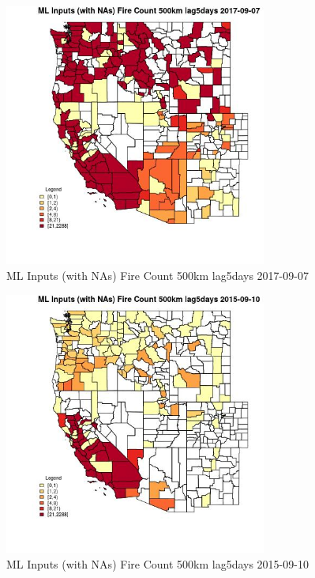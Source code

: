 \begin{figure} 
\centering  
\includegraphics[width=0.77\textwidth]{Code_Outputs/Report_ML_input_PM25_Step4_part_e_de_duplicated_aves_compiled_2019-05-21wNAs_CountyFire_Count_500km_lag5daysMean2017-09-07.jpg} 
\caption{\label{fig:Report_ML_input_PM25_Step4_part_e_de_duplicated_aves_compiled_2019-05-21wNAsCountyFire_Count_500km_lag5daysMean2017-09-07}ML Inputs (with NAs) Fire Count 500km lag5days 2017-09-07} 
\end{figure} 
 

\begin{figure} 
\centering  
\includegraphics[width=0.77\textwidth]{Code_Outputs/Report_ML_input_PM25_Step4_part_e_de_duplicated_aves_compiled_2019-05-21wNAs_CountyFire_Count_500km_lag5daysMean2015-09-10.jpg} 
\caption{\label{fig:Report_ML_input_PM25_Step4_part_e_de_duplicated_aves_compiled_2019-05-21wNAsCountyFire_Count_500km_lag5daysMean2015-09-10}ML Inputs (with NAs) Fire Count 500km lag5days 2015-09-10} 
\end{figure} 
 

